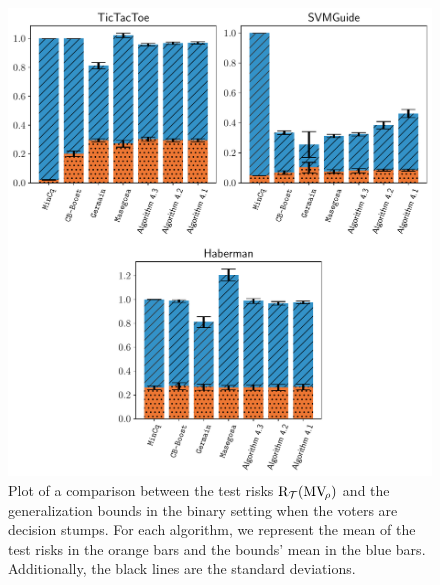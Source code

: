 \begin{figure}
    \centering
    \includegraphics[width=1.0\linewidth]{chapter_4/figures/stump_binary_2.pdf}
    \caption[Comparison Between the Test Risks and the Bounds (2/6)]{
    Plot of a comparison between the test risks $\text{R}_{\mathcal{T}}(\text{MV}_{\!\rho})$ and the generalization bounds in the binary setting when the voters are decision stumps.
    For each algorithm, we represent the mean of the test risks in the orange bars and the bounds' mean in the blue bars.
    Additionally, the black lines are the standard deviations. 
    }
    \label{chap:mv:fig:stump-binary-2}
\end{figure}

